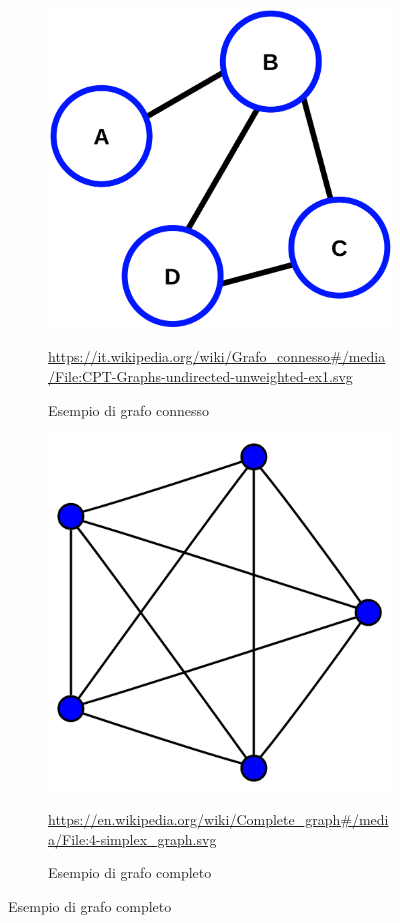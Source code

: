 \begin{figure}[!hb]
	\centering
	\begin{subfigure}[b]{0.45\textwidth}
		\centering
		\includegraphics[width=\textwidth]{img/CPT-Graphs-undirected-unweighted-ex1.svg.png}
		\caption{Esempio di grafo connesso}
		\url{https://it.wikipedia.org/wiki/Grafo_connesso#/media/File:CPT-Graphs-undirected-unweighted-ex1.svg}
		\label{fig:connected_graph_example}
	\end{subfigure}
	\hfill
	\begin{subfigure}[b]{0.45\textwidth}
		\centering
		\includegraphics[width=\textwidth]{img/4-simplex_graph.svg.png}
		\caption{Esempio di grafo completo}
		\url{https://en.wikipedia.org/wiki/Complete_graph#/media/File:4-simplex_graph.svg}
		\label{fig:complete_graph_example}
	\end{subfigure}
\end{figure}

